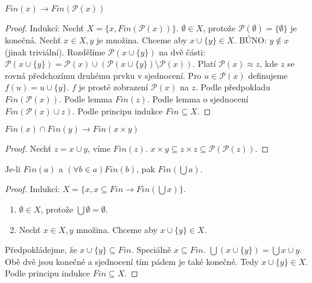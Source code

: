 \begin{lemma}
	$Fin (x) \rightarrow Fin(\mathcal{P}(x))$
\end{lemma}

\begin{proof}
	Indukcí: Nechť $X = \{x, Fin(\mathcal{P}(x))\}$. $\emptyset \in X$, protože $\mathcal{P}(\emptyset) = \{\emptyset\}$ je konečná. Nechť $x \in X, y$ je množina. Chceme aby $x \cup \{y\} \in X$. BÚNO: $y \notin x$ (jinak triviální). Rozdělíme $\mathcal{P}(x \cup \{y\})$ na dvě části: $\mathcal{P}(x \cup \{y\}) = \mathcal{P}(x) \cup (\mathcal{P}(x \cup \{y\}) \setminus \mathcal{P}(x))$. Platí $\mathcal{P}(x) \approx z$, kde $z$ se rovná předchozímu druhému prvku v sjednocení. Pro $u \in \mathcal{P}(x)$ definujeme $f(u) = u \cup \{y\}$. $f$ je prosté zobrazení $\mathcal{P}(x)$ na $z$. Podle předpokladu $Fin(\mathcal{P}(x))$. Podle lemma $Fin(z)$. Podle lemma o sjednocení $Fin(\mathcal{P}(x) \cup z)$. Podle principu indukce $Fin \subseteq X$.
\end{proof}

\begin{dusl}
	$Fin(x) \cap Fin(y) \rightarrow Fin(x \times y)$
\end{dusl}

\begin{proof}
	Nechť $z = x \cup y$, víme $Fin(z)$. $x \times y \subseteq z \times z \subseteq \mathcal{P}(\mathcal{P}(z))$.
\end{proof}

\begin{lemma}
	Je-li $Fin(a)$ a $(\forall b \in a) Fin(b)$, pak $Fin(\bigcup a)$.
\end{lemma}

\begin{proof}
	Indukcí: $X = \{x, x \subseteq Fin \rightarrow Fin(\bigcup x)\}$.
	
	\begin{enumerate}
		\item $\emptyset \in X$, protože $\bigcup \emptyset = \emptyset$.
		\item Nechť $x \in X, y$ množina. Chceme aby $x \cup \{y\} \in X$.
	\end{enumerate}
	
	Předpokládejme, že $x \cup \{y\} \subseteq Fin$. Speciálně $x \subseteq Fin$. $\bigcup (x \cup \{y\}) = \bigcup x \cup y$. Obě dvě jsou konečné a sjednocení tím pádem je také konečné. Tedy $x \cup \{y\} \in X$. Podle principu indukce $Fin \subseteq X$.
\end{proof}

